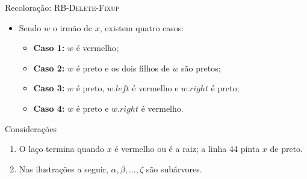 \documentclass[aspectratio=169,10pt]{beamer}
\newcommand{\proc}[1]{\textnormal{\rmfamily\textsc{#1}}}
\newcommand{\at}[1]{.\mathit{#1}}
\begin{document}
\begin{frame}{Recoloração: \proc{RB-Delete-Fixup}}
  \begin{itemize}
    \item Sendo $w$ o irmão de $x$, existem quatro casos:
      \begin{itemize}
        \item \textbf{Caso 1:} $w$ é vermelho;
        \item \textbf{Caso 2:} $w$ é preto e os dois filhos de $w$ são pretos;
        \item \textbf{Caso 3:} $w$ é preto, $w\at{left}$ é vermelho e $w\at{right}$ é preto;
        \item \textbf{Caso 4:} $w$ é preto e $w\at{right}$ é vermelho.
      \end{itemize}
  \end{itemize}

  \vspace{4mm}
  \begin{block}{Considerações}
    \begin{enumerate}
      \item O laço termina quando $x$ é vermelho ou é a raiz; a linha 44 pinta $x$ de preto.
      \item Nas ilustrações a seguir, $\alpha, \beta, \dots, \zeta$ são subárvores.
    \end{enumerate}
  \end{block}
\end{frame}
\end{document}
